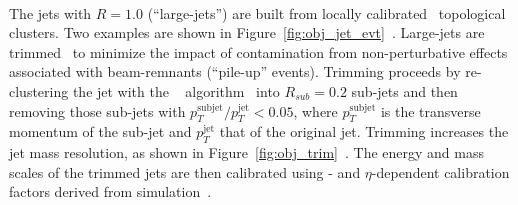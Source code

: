 \paragraph{}
The jets with $R=1.0$ (``large-\R jets'') are built from locally calibrated~\cite{Aad:2011he} topological clusters.
Two examples are shown in Figure~\ref{fig:obj_jet_evt}~\cite{ATLAS-CONF-2015-035}.
Large-\R jets are trimmed~\cite{Krohn2010} to minimize the impact of contamination from non-perturbative effects associated with beam-remnants (``pile-up'' events).
Trimming proceeds by re-clustering the jet with the \kt~ algorithm~\cite{Ellis:1993tq} into $R_{sub} = 0.2$ sub-jets and then removing those sub-jets with $p_T^{\mathrm{subjet}}/p_T^{\mathrm{jet}} < 0.05$, where $p_T^{\mathrm{subjet}}$ is the transverse momentum of the sub-jet and $p_T^{\mathrm{jet}}$ that of the original jet.
Trimming increases the jet mass resolution, as shown in Figure~\ref{fig:obj_trim}~\cite{ATL-PHYS-PUB-2017-020}.
The energy and mass scales of the trimmed jets are then calibrated using \pt- and $\eta$-dependent calibration factors derived from simulation~\cite{PERF-2012-02}.

